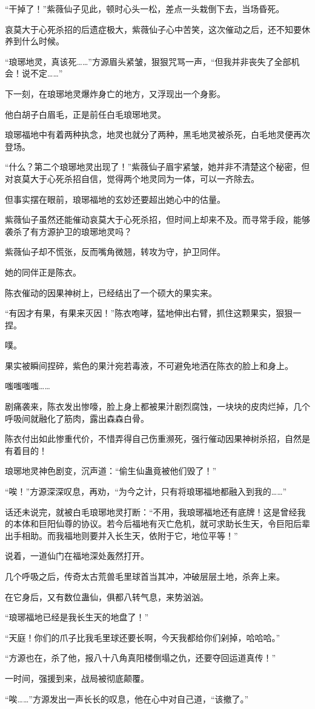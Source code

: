 \begin{this_body}
“干掉了！”紫薇仙子见此，顿时心头一松，差点一头栽倒下去，当场昏死。

哀莫大于心死杀招的后遗症极大，紫薇仙子心中苦笑，这次催动之后，还不知要休养到什么时候。

“琅琊地灵，真该死……”方源眉头紧皱，狠狠咒骂一声，“但我并非丧失了全部机会！说不定……”

下一刻，在琅琊地灵爆炸身亡的地方，又浮现出一个身影。

他白胡子白眉毛，正是前任白毛琅琊地灵。

琅琊福地中有着两种执念，地灵也就分了两种，黑毛地灵被杀死，白毛地灵便再次登场。

“什么？第二个琅琊地灵出现了！”紫薇仙子眉宇紧皱，她并非不清楚这个秘密，但对哀莫大于心死杀招自信，觉得两个地灵同为一体，可以一齐除去。

但事实摆在眼前，琅琊福地的玄妙还要超出她心中的估量。

紫薇仙子虽然还能催动哀莫大于心死杀招，但时间上却来不及。而寻常手段，能够袭杀了有方源护卫的琅琊地灵吗？

紫薇仙子却不慌张，反而嘴角微翘，转攻为守，护卫同伴。

她的同伴正是陈衣。

陈衣催动的因果神树上，已经结出了一个硕大的果实来。

“有因才有果，有果来灭因！”陈衣咆哮，猛地伸出右臂，抓住这颗果实，狠狠一捏。

噗。

果实被瞬间捏碎，紫色的果汁宛若毒液，不可避免地洒在陈衣的脸上和身上。

嗤嗤嗤嗤……

剧痛袭来，陈衣发出惨嚎，脸上身上都被果汁剧烈腐蚀，一块块的皮肉烂掉，几个呼吸间就融化了筋肉，露出森森白骨。

陈衣付出如此惨重代价，不惜弄得自己伤重濒死，强行催动因果神树杀招，自然是有着目的！

琅琊地灵神色剧变，沉声道：“偷生仙蛊竟被他们毁了！”

“唉！”方源深深叹息，再劝，“为今之计，只有将琅琊福地都融入到我的……”

话还未说完，就被白毛琅琊地灵打断：“不用，我琅琊福地还有底牌！这是曾经我的本体和巨阳仙尊的协议。若今后福地有灭亡危机，就可求助长生天，令巨阳后辈出手相助。而我福地则要并入长生天，依附于它，地位平等！”

说着，一道仙门在福地深处轰然打开。

几个呼吸之后，传奇太古荒兽毛里球首当其冲，冲破层层土地，杀奔上来。

在它身后，又有数位蛊仙，俱都八转气息，来势汹汹。

“琅琊福地已经是我长生天的地盘了！”

“天庭！你们的爪子比我毛里球还要长啊，今天我都给你们剁掉，哈哈哈。”

“方源也在，杀了他，报八十八角真阳楼倒塌之仇，还要夺回运道真传！”

一时间，强援到来，战局被彻底颠覆。

“唉……”方源发出一声长长的叹息，他在心中对自己道，“该撤了。”

\end{this_body}

